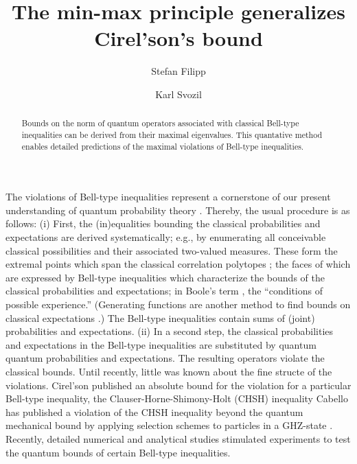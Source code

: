 \documentclass[pra,preprint,showpacs,showkeys,amsfonts]{revtex4}
\begin{document}
\title{The min-max principle generalizes Cirel'son's bound}
\author{Stefan Filipp}
\author{Karl Svozil}


\begin{abstract}
Bounds on the norm of quantum operators associated with classical Bell-type inequalities
can be derived from their maximal eigenvalues.
This quantative method enables detailed
predictions of the maximal violations of Bell-type inequalities.
\end{abstract}


\maketitle

The violations of Bell-type inequalities represent
a cornerstone of our present understanding of quantum probability theory
\cite{peres}.
Thereby, the usual procedure is as follows:
(i)
First, the (in)equalities bounding the classical probabilities and expectations are
derived systematically; e.g., by enumerating all conceivable classical possibilities
and their associated two-valued measures.
These form the extremal points which span
the classical correlation polytopes
\cite{cirelson:80,cirelson,froissart-81,pitowsky-86,pitowsky,pitowsky-89a,Pit-91,Pit-94,2000-poly,collins-gisin-2003,sliwa-2003};
the faces of which are expressed by Bell-type inequalities
which characterize the bounds of the classical probabilities and expectations;
in Boole's term \cite{Boole,Boole-62}, the ``conditions of possible experience.''
(Generating functions are another method to find bounds on classical expectations \cite{werner-wolf-2001,schachner-2003}.)
The Bell-type inequalities contain sums of (joint) probabilities and expectations.
(ii)
In a second step, the classical probabilities and expectations in
the Bell-type inequalities are substituted by quantum quantum probabilities and expectations.
The resulting operators violate the classical bounds.
Until recently, little was known about the fine structe of the violations.
Cirel'son published an absolute bound for the violation for a particular Bell-type inequality,
the Clauser-Horne-Shimony-Holt (CHSH) inequality \cite{cirelson:80,cirelson:87,cirelson,khalfin-97}
Cabello has published a violation of the CHSH inequality beyond the quantum mechanical
bound by applying selection schemes to particles in a GHZ-state
\cite{cabello-02a,cabello-02b}.
Recently, detailed numerical  \cite{filipp-svo-04-qpoly}
and analytical studies \cite{cabello-2003a} stimulated
experiments \cite{bovino-2003} to test the quantum bounds of certain Bell-type inequalities.
\end{document}
